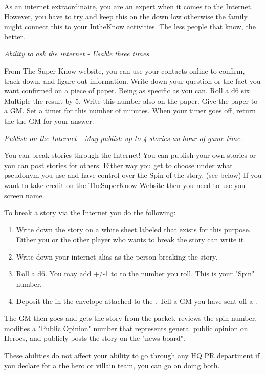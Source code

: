\documentclass[green]{LRSguildcamp1}
\begin{document}
\name{\gInternetPR{}}

As an internet extraordinaire, you are an expert when it comes to the Internet. However, you have to try and keep this on the down low otherwise the family might connect this to your IntheKnow activities. The less people that know, the better. 

\textit{Ability to ask the internet - Usable three times}

From The Super Know website, you can use your contacts online to confirm, track down, and figure out information. Write down your question or the fact you want confirmed on a piece of paper. Being as specific as you can. Roll a d6 six. Multiple the result by 5. Write this number also on the paper. Give the paper to a GM. Set a timer for this number of minutes. When your timer goes off, return the the GM for your answer. 

\textit{Publish on the Internet - May publish up to 4 stories an hour of game time.}

You can break stories through the Internet! You can publish your own stories or you can post stories for others. Either way you get to choose under what pseudonym you use and have control over the Spin of the story. (see below) If you want to take credit on the TheSuperKnow Website then you need to use you screen name.

To break a story via the Internet you do the following:
\begin{enumerate}
\item Write down the story on a white sheet labeled \wPressRelease{} that exists for this purpose. Either you or the other player who wants to break the story can write it. 
\item Write down your internet alias as the person breaking the story.  
\item Roll a d6.  You may add +/-1 to to the number you roll. This is your "Spin" number.
\item Deposit the \wPressRelease{} in the envelope attached to the \sComputer{}. 
Tell a GM you have sent off a \wPressRelease{}.
\end{enumerate}

The GM then goes and gets the story from the packet, reviews the spin number, modifies a "Public Opinion" number that represents general public opinion on Heroes, and publicly posts the story on the "news board". 

These abilities do not affect your ability to go through any HQ PR department if you declare for a the hero or villain team, you can go on doing both. 
\end{document}
